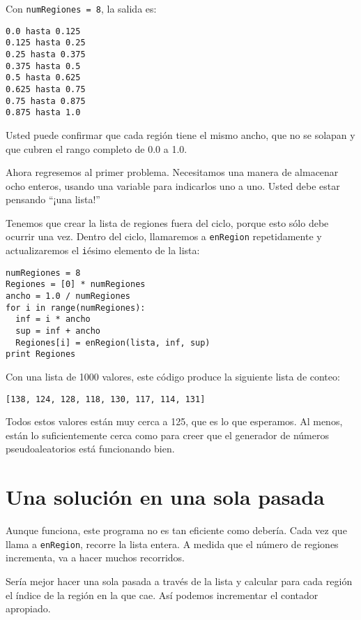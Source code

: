 Con \texttt{numRegiones = 8}, la salida es:

\beforeverb
\begin{verbatim}
0.0 hasta 0.125
0.125 hasta 0.25
0.25 hasta 0.375
0.375 hasta 0.5
0.5 hasta 0.625
0.625 hasta 0.75
0.75 hasta 0.875
0.875 hasta 1.0
\end{verbatim}
\afterverb
%
Usted puede confirmar que cada región tiene el mismo ancho,
que no se solapan y que cubren el rango completo de  0.0 a 1.0.

Ahora regresemos al primer problema. Necesitamos una manera
de almacenar ocho enteros, usando una variable para indicarlos
uno a uno.  Usted debe estar pensando ``¡una lista!''

Tenemos que crear la lista de regiones fuera del ciclo, porque 
esto sólo debe ocurrir una vez. Dentro del ciclo, llamaremos
a \texttt{enRegion} repetidamente y actualizaremos el  \texttt{i}ésimo 
elemento de la lista:

\beforeverb
\begin{verbatim}
numRegiones = 8
Regiones = [0] * numRegiones
ancho = 1.0 / numRegiones
for i in range(numRegiones):
  inf = i * ancho
  sup = inf + ancho
  Regiones[i] = enRegion(lista, inf, sup)
print Regiones
\end{verbatim}
\afterverb
%
Con una lista de 1000 valores, este código produce la siguiente lista
de conteo:

\beforeverb
\begin{verbatim}
[138, 124, 128, 118, 130, 117, 114, 131]
\end{verbatim}
\afterverb
%
Todos estos valores están muy cerca a 125, que es lo que esperamos.
Al menos, están lo suficientemente cerca como para creer que el
generador de números pseudoaleatorios está funcionando bien.




\section{Una solución en una sola pasada}

Aunque funciona, este programa no es tan eficiente como debería.
Cada vez que llama a \texttt{enRegion}, recorre la lista entera.  A medida
que el número de regiones incrementa, va a hacer muchos
recorridos.

Sería mejor hacer una sola pasada a través de la lista y calcular
para cada región el índice de la región en la que cae. Así podemos
incrementar el contador apropiado.

